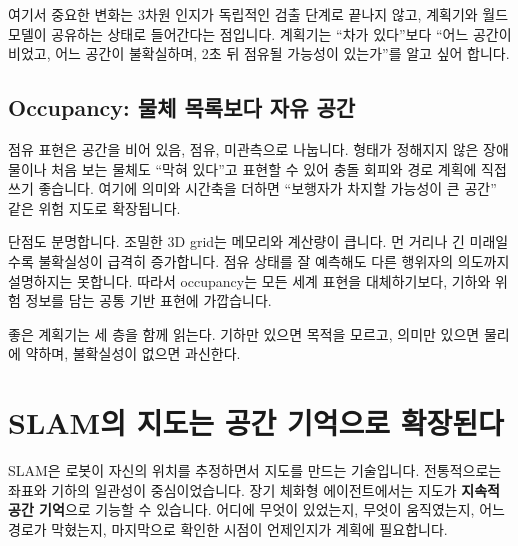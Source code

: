 \documentclass[11pt,openany]{book}
\newcommand{\keyterm}[1]{{\sffamily\bfseries\color{deepblue}#1}}
\begin{document}
여기서 중요한 변화는 3차원 인지가 독립적인 검출 단계로 끝나지 않고, 계획기와 월드모델이 공유하는 상태로 들어간다는 점입니다. 계획기는 ``차가 있다''보다 ``어느 공간이 비었고, 어느 공간이 불확실하며, 2초 뒤 점유될 가능성이 있는가''를 알고 싶어 합니다.

\subsection{Occupancy: 물체 목록보다 자유 공간}

점유 표현은 공간을 비어 있음, 점유, 미관측으로 나눕니다. 형태가 정해지지 않은 장애물이나 처음 보는 물체도 ``막혀 있다''고 표현할 수 있어 충돌 회피와 경로 계획에 직접 쓰기 좋습니다. 여기에 의미와 시간축을 더하면 ``보행자가 차지할 가능성이 큰 공간'' 같은 위험 지도로 확장됩니다.

단점도 분명합니다. 조밀한 3D grid는 메모리와 계산량이 큽니다. 먼 거리나 긴 미래일수록 불확실성이 급격히 증가합니다. 점유 상태를 잘 예측해도 다른 행위자의 의도까지 설명하지는 못합니다. 따라서 occupancy는 모든 세계 표현을 대체하기보다, 기하와 위험 정보를 담는 공통 기반 표현에 가깝습니다.

\begin{boardbox}[세계 상태의 세 층]
\begin{center}
\end{center}
\small 좋은 계획기는 세 층을 함께 읽는다. 기하만 있으면 목적을 모르고, 의미만 있으면 물리에 약하며, 불확실성이 없으면 과신한다.
\end{boardbox}

\section{SLAM의 지도는 공간 기억으로 확장된다}

SLAM은 로봇이 자신의 위치를 추정하면서 지도를 만드는 기술입니다. 전통적으로는 좌표와 기하의 일관성이 중심이었습니다. 장기 체화형 에이전트에서는 지도가 \keyterm{지속적 공간 기억}으로 기능할 수 있습니다. 어디에 무엇이 있었는지, 무엇이 움직였는지, 어느 경로가 막혔는지, 마지막으로 확인한 시점이 언제인지가 계획에 필요합니다.
\end{document}
